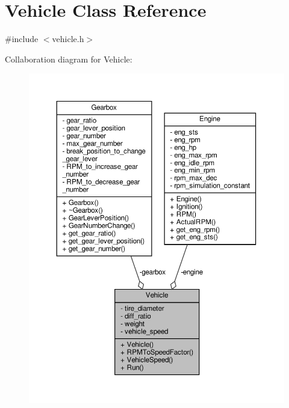 \hypertarget{classVehicle}{}\section{Vehicle Class Reference}
\label{classVehicle}


{\ttfamily \#include $<$vehicle.\+h$>$}



Collaboration diagram for Vehicle\+:
\nopagebreak
\begin{figure}[H]
\begin{center}
\leavevmode
\includegraphics[width=350pt]{classVehicle__coll__graph}
\end{center}
\end{figure}
